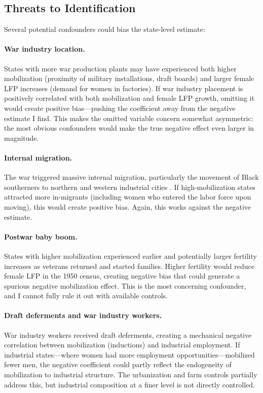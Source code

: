 \documentclass[12pt]{article}
\begin{document}
\subsection{Threats to Identification}

Several potential confounders could bias the state-level estimate:

\paragraph{War industry location.} States with more war production plants may have experienced both higher mobilization (proximity of military installations, draft boards) and larger female LFP increases (demand for women in factories). If war industry placement is positively correlated with both mobilization and female LFP growth, omitting it would create positive bias---pushing the coefficient away from the negative estimate I find. This makes the omitted variable concern somewhat asymmetric: the most obvious confounders would make the true negative effect even larger in magnitude.

\paragraph{Internal migration.} The war triggered massive internal migration, particularly the movement of Black southerners to northern and western industrial cities \citep{boustan2010was, collins2014great}. If high-mobilization states attracted more in-migrants (including women who entered the labor force upon moving), this would create positive bias. Again, this works against the negative estimate.

\paragraph{Postwar baby boom.} States with higher mobilization experienced earlier and potentially larger fertility increases as veterans returned and started families. Higher fertility would reduce female LFP in the 1950 census, creating negative bias that could generate a spurious negative mobilization effect. This is the most concerning confounder, and I cannot fully rule it out with available controls.

\paragraph{Draft deferments and war industry workers.} War industry workers received draft deferments, creating a mechanical negative correlation between mobilization (inductions) and industrial employment. If industrial states---where women had more employment opportunities---mobilized fewer men, the negative coefficient could partly reflect the endogeneity of mobilization to industrial structure. The urbanization and farm controls partially address this, but industrial composition at a finer level is not directly controlled.
\end{document}
